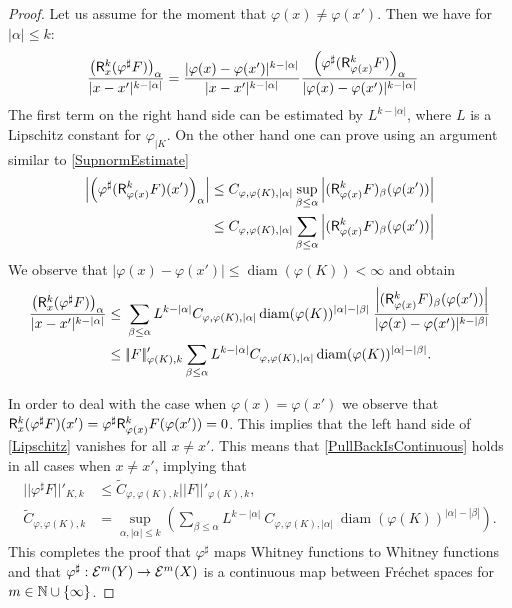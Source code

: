 \begin{proof}
  
Let us assume for the moment that $\varphi(x)\ne \varphi(x')$. Then we have for $|\alpha|\le k$: 
  \begin{align}\label{Lipschitz}
  {\left(\mathsf{R}_x^k(\varphi^{\sharp}F)\right)_\alpha\over |x-x'|^{k-|\alpha|}}&= {|\varphi(x)-\varphi(x')|^{k-|\alpha|}\over |x-x'|^{k-|\alpha|}}{\left(\varphi^{\sharp}(\mathsf{R}_{\varphi(x)}^k F)\right)_\alpha\over |\varphi(x)-\varphi(x')|^{k-|\alpha|}}
  \end{align}
  The first term on the right hand side can be estimated by $L^{k-|\alpha|}$, where $L$ is a Lipschitz constant for $\varphi_{|K}$. On the other hand one can prove using an argument similar to \eqref{SupnormEstimate}
  \begin{align*} 
  \left|\left(\varphi^{\sharp}(\mathsf{R}_{\varphi(x)}^k F)(x')\right)_\alpha\right|&\le C_{\varphi,\varphi(K),|\alpha|}\sup_{\beta\le \alpha}\left| (\mathsf{R}_{\varphi(x)}^k F)_{\beta}(\varphi(x'))\right|\\
  & \le C_{\varphi,\varphi(K),|\alpha|}\sum_{\beta\le \alpha}\left| (\mathsf{R}_{\varphi(x)}^k F)_{\beta}(\varphi(x'))\right|
  \end{align*}
  We observe that $|\varphi(x)-\varphi(x')|\le \operatorname {diam}(\varphi(K))<\infty$ and  obtain 
  \begin{align}\label{PullBackIsContinuous}
\nonumber  {\left(\mathsf{R}_x^k(\varphi^{\sharp}F)\right)_\alpha\over |x-x'|^{k-|\alpha|}}&
   \le \:\sum_{\beta\le \alpha} L^{k-|\alpha|} C_{\varphi,\varphi(K),|\alpha|}\operatorname {diam}(\varphi(K))^{|\alpha|-|\beta|}\:{\left| (\mathsf{R}_{\varphi(x)}^k F)_{\beta}(\varphi(x'))\right|\over |\varphi(x)-\varphi(x')|^{k-|\beta|}}\\
   &\le |\!|F|\!|'_{\varphi(K),k} \sum_{\beta\le \alpha} L^{k-|\alpha|} C_{\varphi,\varphi(K),|\alpha|}\operatorname {diam}(\varphi(K))^{|\alpha|-|\beta|}.
  \end{align}
  
  In order to deal with the case when  $\varphi(x)=\varphi(x')$ we observe that $\mathsf{R}_{x}^k (\varphi^{\sharp} F)(x')=\varphi^{\sharp}\mathsf{R}_{\varphi(x)}^k F(\varphi(x'))=0$. This implies that the left hand side of \eqref{Lipschitz} vanishes for all $x\ne x'$. This means that \eqref{PullBackIsContinuous} holds in all cases when $x\ne x'$, implying that 
  \begin{align*}
 |\!|\varphi^{\sharp} F|\!|'_{K,k}&\le \widetilde C_{\varphi,\varphi(K),k} |\!|F|\!|'_{\varphi(K),k},\\
 \widetilde C_{\varphi,\varphi(K),k}&= \sup_{\alpha,|\alpha|\le k}\left(\sum_{\beta\le \alpha} L^{k-|\alpha|}\:C_{\varphi,\varphi(K),|\alpha|}\:\operatorname {diam}(\varphi(K))^{|\alpha|-|\beta|}\right).
\end{align*}
This completes the proof that $\varphi^{\sharp}$ maps Whitney functions to Whitney functions and that
$\varphi^{\sharp}:\mathcal{E}^m(Y)\to\mathcal{E}^m(X)$ is a continuous map between Fr\'echet spaces for $m\in\mathbb{N}\cup\{\infty\}$. 


\end{proof}
